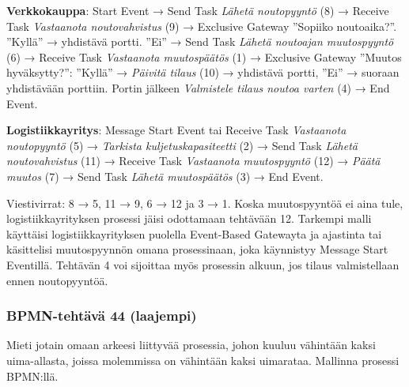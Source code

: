 \documentclass[
  finnish,
  letterpaper,
  DIV=11,
  numbers=noendperiod,
  oneside]{scrreprt}
\begin{document}
\begin{tcolorbox}[enhanced jigsaw, arc=.35mm, bottomrule=.15mm, bottomtitle=1mm, breakable, colback=white, colbacktitle=quarto-callout-tip-color!10!white, colframe=quarto-callout-tip-color-frame, coltitle=black, left=2mm, leftrule=.75mm, opacityback=0, opacitybacktitle=0.6, rightrule=.15mm, title=\textcolor{quarto-callout-tip-color}{\faLightbulb}\hspace{0.5em}{Malliratkaisu}, titlerule=0mm, toprule=.15mm, toptitle=1mm]

\textbf{Verkkokauppa}: Start Event → Send Task \emph{Lähetä noutopyyntö}
(8) → Receive Task \emph{Vastaanota noutovahvistus} (9) → Exclusive
Gateway ''Sopiiko noutoaika?''. ''Kyllä'' → yhdistävä portti. ''Ei'' →
Send Task \emph{Lähetä noutoajan muutospyyntö} (6) → Receive Task
\emph{Vastaanota muutospäätös} (1) → Exclusive Gateway ''Muutos
hyväksytty?'': ''Kyllä'' → \emph{Päivitä tilaus} (10) → yhdistävä
portti, ''Ei'' → suoraan yhdistävään porttiin. Portin jälkeen
\emph{Valmistele tilaus noutoa varten} (4) → End Event.

\textbf{Logistiikkayritys}: Message Start Event tai Receive Task
\emph{Vastaanota noutopyyntö} (5) → \emph{Tarkista kuljetuskapasiteetti}
(2) → Send Task \emph{Lähetä noutovahvistus} (11) → Receive Task
\emph{Vastaanota muutospyyntö} (12) → \emph{Päätä muutos} (7) → Send
Task \emph{Lähetä muutospäätös} (3) → End Event.

Viestivirrat: 8 → 5, 11 → 9, 6 → 12 ja 3 → 1. Koska muutospyyntöä ei
aina tule, logistiikkayrityksen prosessi jäisi odottamaan tehtävään 12.
Tarkempi malli käyttäisi logistiikkayrityksen puolella Event-Based
Gatewayta ja ajastinta tai käsittelisi muutospyynnön omana prosessinaan,
joka käynnistyy Message Start Eventillä. Tehtävän 4 voi sijoittaa myös
prosessin alkuun, jos tilaus valmistellaan ennen noutopyyntöä.

\end{tcolorbox}

\subsubsection{BPMN-tehtävä 44
(laajempi)}\label{bpmn-tehtuxe4vuxe4-44-laajempi}

Mieti jotain omaan arkeesi liittyvää prosessia, johon kuuluu vähintään
kaksi uima-allasta, joissa molemmissa on vähintään kaksi uimarataa.
Mallinna prosessi BPMN:llä.
\end{document}
